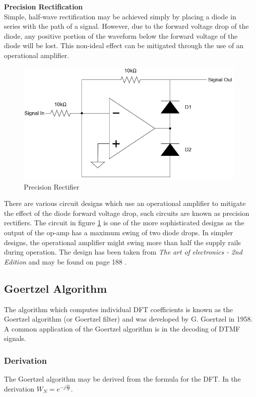 \textbf{Precision Rectification}\\
Simple, half-wave rectification may be achieved simply by placing a diode in series with the path of a signal. However, due to the forward voltage drop of the diode, any positive portion of the waveform below the forward voltage of the diode will be lost. This non-ideal effect can be mitigated through the use of an operational amplifier.

\begin{figure}[H]
	\centering
	\includegraphics[width=0.6\linewidth]{figures/litreview/precision_rectifier.png}
	\caption{Precision Rectifier}
	\label{fig:precision_rectifier}
\end{figure}

There are various circuit designs which use an operational amplifier to mitigate the effect of the diode forward voltage drop, such circuits are known as precision rectifiers. The circuit in figure \ref{fig:precision_rectifier} is one of the more sophisticated designs as the output of the op-amp has a maximum swing of two diode drops. In simpler designs, the operational amplifier might swing more than half the supply rails during operation. The design has been taken from \textit{The art of electronics - 2nd Edition} and may be found on page 188 \cite{Horowitz1995}.



\subsection{Goertzel Algorithm}
\label{sec:goertzel_lit_review}

The algorithm which computes individual DFT coefficients is known as the Goertzel algorithm (or Goertzel filter) and was developed by G. Goertzel in 1958. \cite{Goertzel1958} A common application of the Goertzel algorithm is in the decoding of DTMF\footnotemark{} signals.

\subsubsection{Derivation}
The Goertzel algorithm may be derived from the formula for the DFT. In the derivation \(W_N = e^{-j\frac{2\pi}{N}}\).

